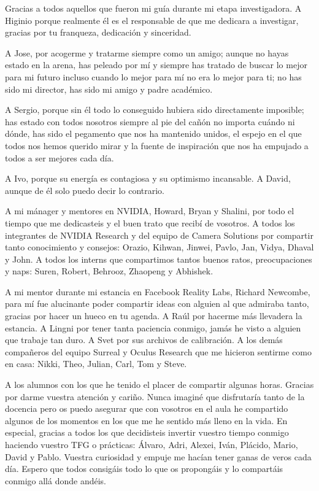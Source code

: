 Gracias a todos aquellos que fueron mi guía durante mi etapa investigadora. A Higinio porque realmente él es el responsable de que me dedicara a investigar, gracias por tu franqueza, dedicación y sinceridad.

A Jose, por acogerme y tratarme siempre como un amigo; aunque no hayas estado en la arena, has peleado por mí y siempre has tratado de buscar lo mejor para mi futuro incluso cuando lo mejor para mí no era lo mejor para ti; no has sido mi director, has sido mi amigo y padre académico.

A Sergio, porque sin él todo lo conseguido hubiera sido directamente imposible; has estado con todos nosotros siempre al pie del cañón no importa cuándo ni dónde, has sido el pegamento que nos ha mantenido unidos, el espejo en el que todos nos hemos querido mirar y la fuente de inspiración que nos ha empujado a todos a ser mejores cada día.

A Ivo, porque su energía es contagiosa y su optimismo incansable. A David, aunque de él solo puedo decir lo contrario.

A mi mánager y mentores en NVIDIA, Howard, Bryan y Shalini, por todo el tiempo que me dedicasteis y el buen trato que recibí de vosotros. A todos los integrantes de NVIDIA Research y del equipo de Camera Solutions por compartir tanto conocimiento y consejos: Orazio, Kihwan, Jinwei, Pavlo, Jan, Vidya, Dhaval y John. A todos los interns que compartimos tantos buenos ratos, preocupaciones y naps: Suren, Robert, Behrooz, Zhaopeng y Abhishek.

A mi mentor durante mi estancia en Facebook Reality Labs, Richard Newcombe, para mí fue alucinante poder compartir ideas con alguien al que admiraba tanto, gracias por hacer un hueco en tu agenda. A Raúl por hacerme más llevadera la estancia. A Lingni por tener tanta paciencia conmigo, jamás he visto a alguien que trabaje tan duro. A Svet por sus archivos de calibración. A los demás compañeros del equipo Surreal y Oculus Research que me hicieron sentirme como en casa: Nikki, Theo, Julian, Carl, Tom y Steve.

A los alumnos con los que he tenido el placer de compartir algunas horas. Gracias por darme vuestra atención y cariño. Nunca imaginé que disfrutaría tanto de la docencia pero os puedo asegurar que con vosotros en el aula he compartido algunos de los momentos en los que me he sentido más lleno en la vida. En especial, gracias a todos los que decidisteis invertir vuestro tiempo conmigo haciendo vuestro TFG o prácticas: Álvaro, Adri, Alexei, Iván, Plácido, Mario, David y Pablo. Vuestra curiosidad y empuje me hacían tener ganas de veros cada día. Espero que todos consigáis todo lo que os propongáis y lo compartáis conmigo allá donde andéis.


